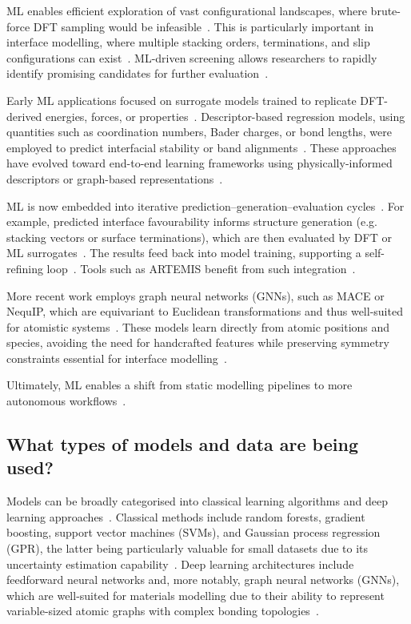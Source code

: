 ML enables efficient exploration of vast configurational landscapes, where brute-force DFT sampling would be infeasible~\nocite{}.
This is particularly important in interface modelling, where multiple stacking orders, terminations, and slip configurations can exist~\cite{Rosen2022-pw}.
ML-driven screening allows researchers to rapidly identify promising candidates for further evaluation~\cite{Batzner2022-fd, Gerber2023-yd, Schutt2019-sz}.

Early ML applications focused on surrogate models trained to replicate DFT-derived energies, forces, or properties~\cite{Batzner2022-fd, Deng2023-tg, Schutt2019-sz}.
Descriptor-based regression models, using quantities such as coordination numbers, Bader charges, or bond lengths, were employed to predict interfacial stability or band alignments~\nocite{}.
These approaches have evolved toward end-to-end learning frameworks using physically-informed descriptors or graph-based representations~\cite{Batzner2022-fd, Gerber2023-yd, Schutt2018-xc}.

ML is now embedded into iterative prediction--generation--evaluation cycles~\nocite{}.
For example, predicted interface favourability informs structure generation (e.g. stacking vectors or surface terminations), which are then evaluated by DFT or ML surrogates~\nocite{}.
The results feed back into model training, supporting a self-refining loop~\cite{Batzner2022-fd, Schutt2018-xc, Schutt2019-sz}.
Tools such as ARTEMIS benefit from such integration~\cite{Taylor2020-nl}.

More recent work employs graph neural networks (GNNs), such as MACE or NequIP, which are equivariant to Euclidean transformations and thus well-suited for atomistic systems~\nocite{}.
These models learn directly from atomic positions and species, avoiding the need for handcrafted features while preserving symmetry constraints essential for interface modelling~\cite{Batzner2022-fd, Deng2023-tg, Owen2024-wp}.

Ultimately, ML enables a shift from static modelling pipelines to more autonomous workflows~\nocite{}.

\newpage \subsection*{What types of models and data are being used?}

Models can be broadly categorised into classical learning algorithms and deep learning approaches~\nocite{}.
Classical methods include random forests, gradient boosting, support vector machines (SVMs), and Gaussian process regression (GPR), the latter being particularly valuable for small datasets due to its uncertainty estimation capability~\cite{hoffmann2025_groupcontribution}.
Deep learning architectures include feedforward neural networks and, more notably, graph neural networks (GNNs), which are well-suited for materials modelling due to their ability to represent variable-sized atomic graphs with complex bonding topologies~\cite{Batzner2022-fd, Deng2023-tg, Rosen2022-pw}.

